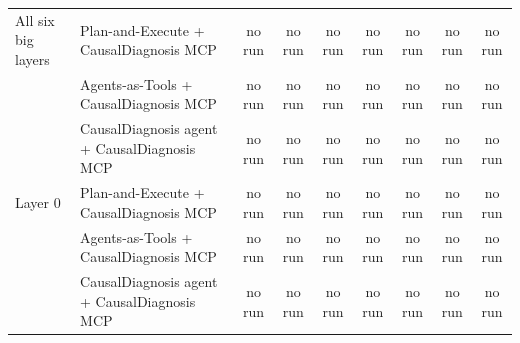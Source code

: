 \documentclass[10pt]{article}
\begin{document}
\begin{table}[H]
\begin{tabular}{llccccccc}
\midrule
All six big layers & Plan-and-Execute + CausalDiagnosis MCP & no run & no run & no run & no run & no run & no run & no run \\
 & Agents-as-Tools + CausalDiagnosis MCP & no run & no run & no run & no run & no run & no run & no run \\
 & CausalDiagnosis agent + CausalDiagnosis MCP & no run & no run & no run & no run & no run & no run & no run \\
\midrule
Layer 0 & Plan-and-Execute + CausalDiagnosis MCP & no run & no run & no run & no run & no run & no run & no run \\
 & Agents-as-Tools + CausalDiagnosis MCP & no run & no run & no run & no run & no run & no run & no run \\
 & CausalDiagnosis agent + CausalDiagnosis MCP & no run & no run & no run & no run & no run & no run & no run \\
\bottomrule
\end{tabular}
\end{table}
\vspace{-8pt}
\end{document}

